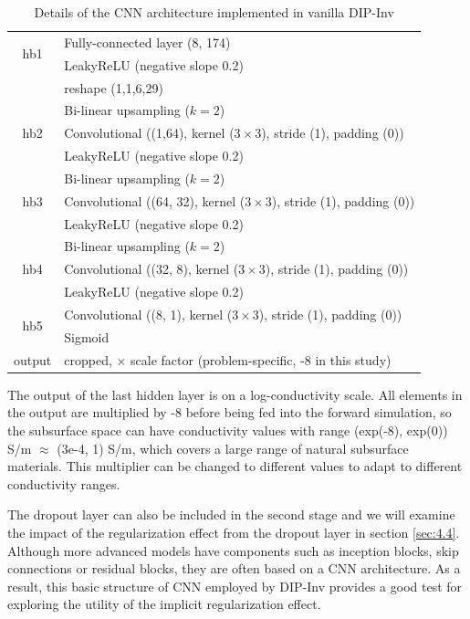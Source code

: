 \documentclass[lettersize,journal]{IEEEtran}
\begin{document}
\begin{table}[h!]
\centering
\caption{Details of the CNN architecture implemented in vanilla DIP-Inv}
\begin{tabular}{|c|l|}
\hline
\multirow{2}{1em}{hb1} & Fully-connected layer (8, 174) \\
& LeakyReLU (negative slope 0.2)\\
\hline
 & reshape (1,1,6,29) \\
\hline
\multirow{3}{1em}{hb2} & Bi-linear upsampling ($k = 2$) \\
&Convolutional ((1,64), kernel ($3 \times 3$), stride (1), padding (0))\\
& LeakyReLU (negative slope 0.2)\\
\hline
\multirow{3}{1em}{hb3} & Bi-linear upsampling ($k = 2$) \\
&Convolutional ((64, 32), kernel ($3 \times 3$), stride (1), padding (0))\\
&LeakyReLU (negative slope 0.2)\\
\hline
\multirow{3}{1em}{hb4} & Bi-linear upsampling ($k = 2$) \\
&Convolutional ((32, 8), kernel ($3 \times 3$), stride (1), padding (0))\\
&LeakyReLU (negative slope 0.2)\\
\hline
\multirow{2}{1em}{hb5}
&Convolutional ((8, 1), kernel ($3 \times 3$), stride (1), padding (0))\\
&Sigmoid\\
\hline
output & cropped, $\times$ scale factor (problem-specific, -8 in this study)\\
\hline
\end{tabular}
\label{table:1}
\end{table}

The output of the last hidden layer is on a log-conductivity scale. All elements in the output are multiplied by -8 before being fed into the forward simulation, so the subsurface space can have conductivity values with range (exp(-8), exp(0)) S/m $\approx$ (3e-4, 1) S/m, which covers a large range of natural subsurface materials. This multiplier can be changed to different values to adapt to different conductivity ranges. 

The dropout layer can also be included in the second stage and we will examine the impact of the regularization effect from the dropout layer in section \ref{sec:4.4}. Although more advanced models have components such as inception blocks, skip connections or residual blocks, they are often based on a CNN architecture. As a result, this basic structure of CNN employed by DIP-Inv provides a good test for exploring the utility of the implicit regularization effect. 
\end{document}
